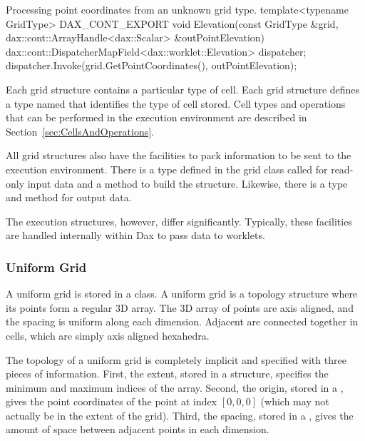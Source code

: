\begin{daxexample}{Processing point coordinates from an unknown grid type.}
template<typename GridType>
DAX_CONT_EXPORT
void Elevation(const GridType &grid,
               dax::cont::ArrayHandle<dax::Scalar> &outPointElevation)
{
  dax::cont::DispatcherMapField<dax::worklet::Elevation> dispatcher;
  dispatcher.Invoke(grid.GetPointCoordinates(), outPointElevation);
}
\end{daxexample}

Each grid structure contains a particular type of cell. Each grid structure
defines a type named   that identifies the
type of cell stored. Cell types and operations that can be performed in the
execution environment are described in
Section~\ref{sec:CellsAndOperations}.

All grid structures also have the facilities to pack information to be sent
to the execution environment. There is a type defined in the grid class
called  for read-only input data and
a  method to build the structure. Likewise, there
is a  type and
 method for output data.

The execution structures, however, differ significantly. Typically, these
facilities are handled internally within Dax to pass data to worklets.

\subsubsection{Uniform Grid}


A uniform grid is stored in a  class. A uniform grid
is a topology structure where its points form a regular 3D array. The 3D
array of points are axis aligned, and the spacing is uniform along each
dimension. Adjacent are connected together in  
cells, which are simply axis aligned hexahedra.

The topology of a uniform grid is completely implicit and specified with
three pieces of information. First, the extent, stored in a 
structure, specifies the minimum and maximum indices of the array. Second,
the origin, stored in a , gives the point coordinates of the
point at index $[0,0,0]$ (which may not actually be in the extent of the
grid). Third, the spacing, stored in a , gives the amount of
space between adjacent points in each dimension.


